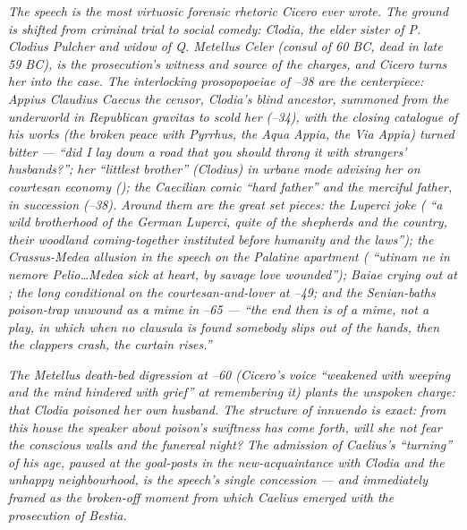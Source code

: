 \textit{The speech is the most virtuosic forensic rhetoric
Cicero ever wrote. The ground is shifted from criminal trial
to social comedy: Clodia, the elder sister of P. Clodius
Pulcher and widow of Q. Metellus Celer (consul of 60 BC, dead
in late 59 BC), is the prosecution's witness and source of the
charges, and Cicero turns her into the case. The interlocking
prosopopoeiae of \textsection{}--38 are the
centerpiece: Appius Claudius Caecus the censor, Clodia's blind
ancestor, summoned from the underworld in Republican gravitas
to scold her (\textsection{}--34), with the closing
catalogue of his works (the broken peace with Pyrrhus, the Aqua
Appia, the Via Appia) turned bitter --- ``did I lay down a road
that you should throng it with strangers' husbands?''; her
``littlest brother'' (Clodius) in urbane mode advising her on
courtesan economy (); the Caecilian comic
``hard father'' and the merciful father, in succession
(\textsection{}--38). Around them are the great set
pieces: the Luperci joke ( ``a wild brotherhood
of the German Luperci, quite of the shepherds and the country,
their woodland coming-together instituted before humanity and
the laws''); the Crassus-Medea allusion in the speech on the
Palatine apartment ( ``\textit{utinam ne in nemore
Pelio}\dots Medea sick at heart, by savage love wounded'');
Baiae crying out at ; the long conditional on
the courtesan-and-lover at \textsection{}--49; and
the Senian-baths poison-trap unwound as a mime in
\textsection{}--65 --- ``the end then is of a mime,
not a play, in which when no \textit{clausula} is found
somebody slips out of the hands, then the clappers crash, the
curtain rises.''}

\textit{The Metellus death-bed digression at
\textsection{}--60 (Cicero's voice ``weakened with
weeping and the mind hindered with grief'' at remembering it)
plants the unspoken charge: that Clodia poisoned her own
husband. The structure of innuendo is exact: from this house
the speaker about poison's swiftness has come forth, will she
not fear the conscious walls and the funereal night? The
\textsection{} admission of Caelius's ``turning''
of his age, paused at the goal-posts in the new-acquaintance
with Clodia and the unhappy neighbourhood, is the speech's
single concession --- and immediately framed as the broken-off
moment from which Caelius emerged with the prosecution of
Bestia.}

